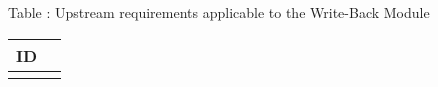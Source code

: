 {
  \vspace{0.5em}
  \begin{center}
    Table \thetable: Upstream requirements applicable to the Write-Back Module\label{tab:wbm-upstream-requirements}
  \end{center}
  
\footnotesize
\begin{xltabular}{0.9\textwidth}{|X|c|}
  \hline
  \textbf{ID} \\
  \hline
   \\
  \hline
\end{xltabular}
}
